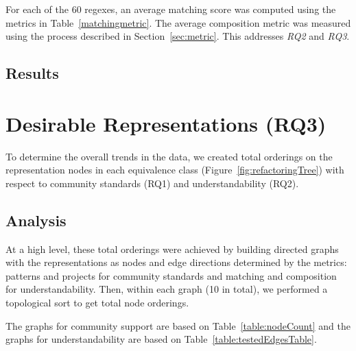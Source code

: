 For each of the 60 regexes, an average matching score was computed using the metrics in Table~\ref{matchingmetric}. The average composition metric was measured using the process described in Section~\ref{sec:metric}. This addresses \emph{RQ2} and \emph{RQ3}.




\subsection{Results}





\section{Desirable Representations (RQ3)}
\label{sec:rq3}
To determine the overall trends in the data, we created total orderings on the representation nodes in each equivalence class (Figure~\ref{fig:refactoringTree})  with respect to community standards (RQ1)  and understandability (RQ2).

\subsection{Analysis}
At a high level, these total orderings were achieved by building directed graphs with the representations as nodes and edge directions determined by the metrics: patterns and projects for community standards and matching and composition for understandability. Then, within each graph (10 in total), we performed a topological sort to get total node orderings.

The graphs for community support are based on Table~\ref{table:nodeCount} and the graphs for understandability are based on Table~\ref{table:testedEdgesTable}.

